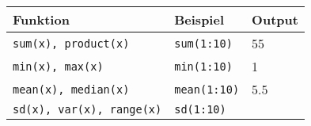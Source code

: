 \documentclass[
]{book}
\begin{document}
\begin{longtable}[]{@{}lll@{}}
\toprule
\begin{minipage}[b]{0.17\columnwidth}\raggedright
Funktion\strut
\end{minipage} & \begin{minipage}[b]{0.19\columnwidth}\raggedright
Beispiel\strut
\end{minipage} & \begin{minipage}[b]{0.56\columnwidth}\raggedright
Output\strut
\end{minipage}\tabularnewline
\midrule
\endhead
\begin{minipage}[t]{0.17\columnwidth}\raggedright
\texttt{sum(x),\ product(x)}\strut
\end{minipage} & \begin{minipage}[t]{0.19\columnwidth}\raggedright
\texttt{sum(1:10)}\strut
\end{minipage} & \begin{minipage}[t]{0.56\columnwidth}\raggedright
55\strut
\end{minipage}\tabularnewline
\begin{minipage}[t]{0.17\columnwidth}\raggedright
\texttt{min(x),\ max(x)}\strut
\end{minipage} & \begin{minipage}[t]{0.19\columnwidth}\raggedright
\texttt{min(1:10)}\strut
\end{minipage} & \begin{minipage}[t]{0.56\columnwidth}\raggedright
1\strut
\end{minipage}\tabularnewline
\begin{minipage}[t]{0.17\columnwidth}\raggedright
\texttt{mean(x),\ median(x)}\strut
\end{minipage} & \begin{minipage}[t]{0.19\columnwidth}\raggedright
\texttt{mean(1:10)}\strut
\end{minipage} & \begin{minipage}[t]{0.56\columnwidth}\raggedright
5.5\strut
\end{minipage}\tabularnewline
\begin{minipage}[t]{0.17\columnwidth}\raggedright
\texttt{sd(x),\ var(x),\ range(x)}\strut
\end{minipage} & \begin{minipage}[t]{0.19\columnwidth}\raggedright
\texttt{sd(1:10)}\strut
\end{minipage} & \begin{minipage}[t]{0.56\columnwidth}\raggedright

\end{minipage}
\end{longtable}
\end{document}
